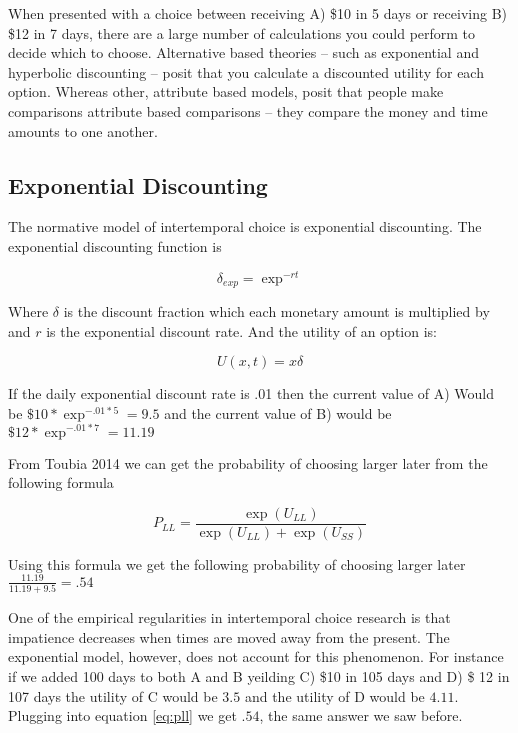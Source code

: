 \documentclass[]{article}
\begin{document}
When presented with a choice between receiving A) \$10 in 5 days or receiving B) \$12 in 7 days, there are a large number of calculations you could perform to decide which to choose.  Alternative based theories -- such as exponential and hyperbolic discounting -- posit that you calculate a discounted utility for each option. Whereas other, attribute based models, posit that people make comparisons attribute based comparisons -- they compare the money and time amounts to one another. 

\subsection{Exponential Discounting}

The normative model of intertemporal choice is exponential discounting.
The exponential discounting function is  

\begin{equation}\label{eq:exp}
	\delta_{exp} = \exp^{-rt}
\end{equation}


Where $\delta$ is the discount fraction which each monetary amount is multiplied by and $r$ is the exponential discount rate. And the utility of an option is:

\begin{equation}\label{eq:utilalt}
	U(x, t) = x \delta
\end{equation}



 If the daily exponential discount rate is .01 then the current value of A) Would be $\$10 * \exp^{-.01*5} = 9.5$ and the current value of B) would be $\$12 * \exp^{-.01*7} = 11.19$

From \cite{@Toubia2014} Toubia 2014 we can get the probability of choosing larger later from the following formula

\begin{equation}\label{eq:pll}
	P_{LL} = \frac{\exp(U_{LL})}{\exp(U_{LL})+ \exp(U_{SS})}
\end{equation}


Using this formula we get the following probability of choosing larger later $\frac{11.19}{11.19+9.5} = .54$

One of the empirical regularities in intertemporal choice research is that impatience decreases when times are moved away from the present. The exponential model, however, does not account for this phenomenon. For instance if we added 100 days to both A and B yeilding C) \$10 in 105 days and D) \$ 12 in 107 days the utility of C would be $3.5$ and the utility of D would be $4.11$. Plugging into equation \ref{eq:pll} we get $.54$, the same answer we saw before. 
\end{document}
